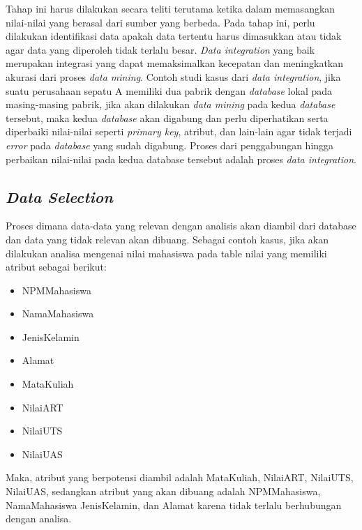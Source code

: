 Tahap ini harus dilakukan secara teliti terutama ketika dalam memasangkan nilai-nilai yang berasal dari sumber yang berbeda. Pada tahap ini, perlu dilakukan identifikasi data apakah data tertentu harus dimasukkan atau tidak agar data yang diperoleh tidak terlalu besar. \textsl{Data integration} yang baik merupakan integrasi yang dapat memaksimalkan kecepatan dan meningkatkan akurasi dari proses \textsl{data mining}. Contoh studi kasus dari \textsl{data integration}, jika suatu perusahaan sepatu A memiliki dua pabrik dengan \textsl{database} lokal pada masing-masing pabrik, jika akan dilakukan \textsl{data mining} pada kedua \textsl{database }tersebut, maka kedua \textsl{database} akan digabung dan perlu diperhatikan serta diperbaiki nilai-nilai seperti \textsl{primary key}, atribut, dan lain-lain agar tidak terjadi \textsl{error} pada \textsl{database} yang sudah digabung. Proses dari penggabungan hingga perbaikan nilai-nilai pada kedua database tersebut adalah proses \textsl{data integration}.

\subsection{\textsl{Data Selection}}
Proses dimana data-data yang relevan dengan analisis akan diambil dari database dan data yang tidak relevan akan dibuang. Sebagai contoh kasus, jika akan dilakukan analisa mengenai nilai mahasiswa pada table nilai yang memiliki atribut sebagai berikut:
	\begin{itemize}
		\item NPMMahasiswa
		\item NamaMahasiswa
		\item JenisKelamin
		\item Alamat
		\item MataKuliah
		\item NilaiART
		\item NilaiUTS
		\item NilaiUAS
	\end{itemize}
Maka, atribut yang berpotensi diambil adalah MataKuliah, NilaiART, NilaiUTS, NilaiUAS, sedangkan atribut yang akan dibuang adalah NPMMahasiswa, NamaMahasiswa JenisKelamin, dan Alamat karena tidak terlalu berhubungan dengan analisa.

